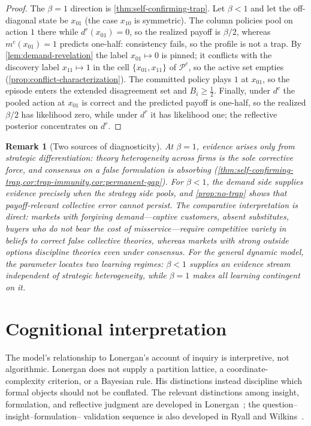 \documentclass[11pt]{article}
\newtheorem{remark}[assumption]{Remark}
\newcommand{\Pcol}{\mathcal P^{c}}
\begin{document}
\begin{proof}
The $\beta=1$ direction is \cref{thm:self-confirming-trap}.  Let $\beta<1$
and let the off-diagonal state be $x_{01}$ (the case $x_{10}$ is symmetric).
The column policies pool on action $1$ there while $d^r(x_{01})=0$, so the
realized payoff is $\beta/2$, whereas $m^c(x_{01})=1$ predicts one-half:
consistency fails, so the profile is not a trap.  By
\cref{lem:demand-revelation} the label $x_{01}\mapsto0$ is pinned; it
conflicts with the discovery label $x_{11}\mapsto1$ in the cell
$\{x_{01},x_{11}\}$ of $\Pcol$, so the active set empties
(\cref{prop:conflict-characterization}).  The committed policy plays $1$ at
$x_{01}$, so the episode enters the extended disagreement set and
$B_i\geq\tfrac12$.  Finally, under $d^c$ the pooled action at $x_{01}$ is
correct and the predicted payoff is one-half, so the realized $\beta/2$ has
likelihood zero, while under $d^r$ it has likelihood one; the reflective
posterior concentrates on $d^r$.
\end{proof}

\begin{remark}[Two sources of diagnosticity]
\label{rem:two-sources}
At $\beta=1$, evidence arises only from strategic differentiation: theory
heterogeneity across firms is the sole corrective force, and consensus on a
false formulation is absorbing
(\cref{thm:self-confirming-trap,cor:trap-immunity,cor:permanent-gap}).  For
$\beta<1$, the demand side supplies evidence precisely when the strategy side
pools, and \cref{prop:no-trap} shows that payoff-relevant collective error
cannot persist.  The comparative interpretation is direct: markets with
forgiving demand---captive customers, absent substitutes, buyers who do not
bear the cost of misservice---require competitive variety in beliefs to
correct false collective theories, whereas markets with strong outside
options discipline theories even under consensus.  For the general dynamic
model, the parameter locates two learning regimes: $\beta<1$ supplies an
evidence stream independent of strategic heterogeneity, while $\beta=1$ makes
all learning contingent on it.
\end{remark}

\section{Cognitional interpretation}

The model's relationship to Lonergan's account of inquiry is interpretive, not
algorithmic.  Lonergan does not supply a partition lattice, a coordinate-
complexity criterion, or a Bayesian rule.  His distinctions instead discipline
which formal objects should not be conflated.  The relevant distinctions among
insight, formulation, and reflective judgment are developed in
Lonergan~\cite[chs.~1 and 10]{Lonergan1992}; the question--insight--formulation--
validation sequence is also developed in Ryall and
Wilkins~\cite{RyallWilkins2018}.
\end{document}
